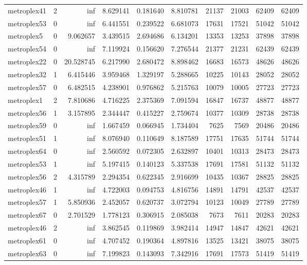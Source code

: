 \begin{longtable}{|l|r|r|r|r|r|r|r|r|r|}
metroplex41 & 2 & inf & 8.629141 & 0.181640 & 8.810781 & 21137 & 21003 & 62409 & 62409 \\
metroplex53 & 0 & inf & 6.441551 & 0.239522 & 6.681073 & 17631 & 17521 & 51042 & 51042 \\
metroplex5 & 0 & 9.062657 & 3.439515 & 2.694686 & 6.134201 & 13353 & 13253 & 37898 & 37898 \\
metroplex54 & 0 & inf & 7.119924 & 0.156620 & 7.276544 & 21377 & 21231 & 62439 & 62439 \\
metroplex22 & 0 & 20.528745 & 6.217990 & 2.680472 & 8.898462 & 16683 & 16573 & 48626 & 48626 \\
metroplex32 & 1 & 6.415446 & 3.959468 & 1.329197 & 5.288665 & 10225 & 10143 & 28052 & 28052 \\
metroplex57 & 0 & 6.482515 & 4.238901 & 0.976862 & 5.215763 & 10079 & 10005 & 27723 & 27723 \\
metroplex1 & 2 & 7.810686 & 4.716225 & 2.375369 & 7.091594 & 16847 & 16737 & 48877 & 48877 \\
metroplex56 & 1 & 3.157895 & 2.344447 & 0.415227 & 2.759674 & 10377 & 10309 & 28738 & 28738 \\
metroplex59 & 0 & inf & 1.667459 & 0.066945 & 1.734404 & 7625 & 7569 & 20486 & 20486 \\
metroplex51 & 1 & inf & 8.076940 & 0.110649 & 8.187589 & 17751 & 17635 & 51744 & 51744 \\
metroplex64 & 0 & inf & 2.560592 & 0.072305 & 2.632897 & 10401 & 10313 & 28473 & 28473 \\
metroplex53 & 1 & inf & 5.197415 & 0.140123 & 5.337538 & 17691 & 17581 & 51132 & 51132 \\
metroplex56 & 2 & 4.315789 & 2.294354 & 0.622345 & 2.916699 & 10435 & 10367 & 28825 & 28825 \\
metroplex46 & 1 & inf & 4.722003 & 0.094753 & 4.816756 & 14891 & 14791 & 42537 & 42537 \\
metroplex57 & 1 & 5.850936 & 2.452057 & 0.620737 & 3.072794 & 10123 & 10049 & 27789 & 27789 \\
metroplex67 & 0 & 2.701529 & 1.778123 & 0.306915 & 2.085038 & 7673 & 7611 & 20283 & 20283 \\
metroplex46 & 2 & inf & 3.862545 & 0.119869 & 3.982414 & 14947 & 14847 & 42621 & 42621 \\
metroplex61 & 0 & inf & 4.707452 & 0.190364 & 4.897816 & 13525 & 13421 & 38075 & 38075 \\
metroplex63 & 0 & inf & 7.199823 & 0.143093 & 7.342916 & 17691 & 17573 & 51419 & 51419 \\

\end{longtable}
